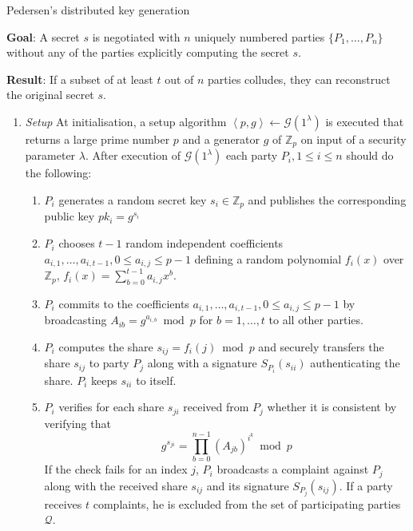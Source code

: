 \begin{algorithm}
\caption{Pedersen's distributed key generation~\cite{art:Pedersen91a}}
\label{alg:pedersen_dkg}
 \textbf{Goal}: A secret $s$ is negotiated with $n$ uniquely numbered parties $\{ P_1, \ldots, P_n \}$ without any of the parties explicitly computing the secret $s$.
 
 \textbf{Result}: If a subset of at least $t$ out of $n$ parties colludes, they can reconstruct the original secret $s$.
 \begin{enumerate}
  \item \textit{Setup} At initialisation, a setup algorithm $\left< p, g \right> \leftarrow \mathcal{G} \left( 1^{\lambda} \right)$ is executed that returns a large prime number $p$ and a generator $g$ of $\mathbb{Z}_p$ on input of a security parameter $\lambda$. After execution of $\mathcal{G} \left( 1^{\lambda} \right)$ each party $P_i, 1 \leq i \leq n$ should do the following:
   \begin{enumerate}
    \item $P_i$ generates a random secret key $s_i \in \mathbb{Z}_p$ and publishes the corresponding public key $pk_i = g^{s_i}$
    \item $P_i$ chooses $t-1$ random independent coefficients $a_{i,1}, \ldots, a_{i,t-1}, 0 \leq a_{i,j} \leq p-1$ defining a random polynomial $f_i \left( x \right)$ over $\mathbb{Z}_p$, $f_i \left( x \right) = \sum^{t-1}_{b=0} a_{i,j} x^b$.
    \item $P_i$ commits to the coefficients $a_{i,1}, \ldots, a_{i,t-1}, 0 \leq a_{i,j} \leq p-1$ by broadcasting $A_{ib} = g^{a_{i,b}} \bmod p$ for $b = 1, \ldots, t$ to all other parties.
    \item $P_i$ computes the share $s_{ij} = f_i \left( j \right) \bmod p$ and securely transfers the share $s_{ij}$ to party $P_j$ along with a signature $S_{P_i} \left( s_{ii} \right)$ authenticating the share. $P_i$ keeps $s_{ii}$ to itself.
    \item $P_i$ verifies for each share $s_{ji}$ received from $P_j$ whether it is consistent by verifying that
    \begin{equation*}
     g^{s_{ji}} = \prod_{b=0}^{n-1} \left( A_{jb} \right)^{i^k} \bmod p
    \end{equation*}
    If the check fails for an index $j$, $P_i$ broadcasts a complaint against $P_j$ along with the received share $s_{ij}$ and its signature $S_{P_j} \left( s_{ij} \right)$. If a party receives $t$ complaints, he is excluded from the set of participating parties $\mathcal{Q}$.

\end{enumerate}
\end{enumerate}
\end{algorithm}
